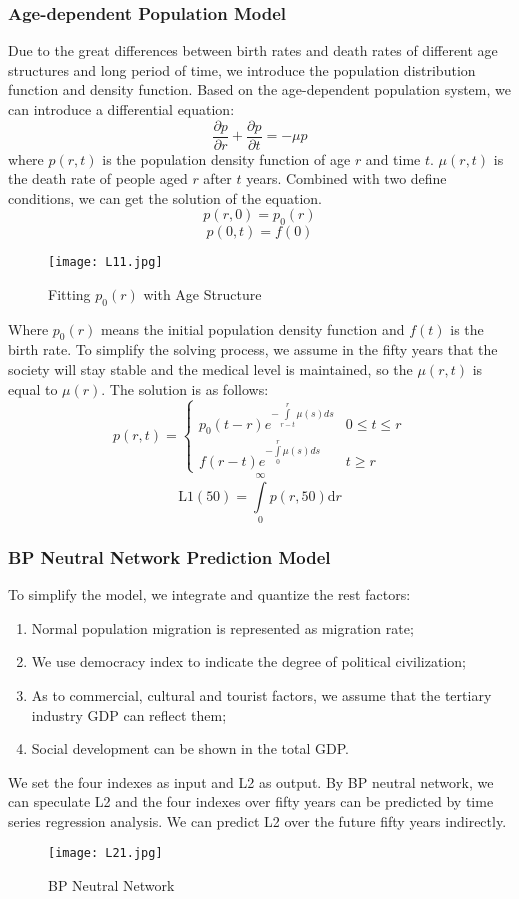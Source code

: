 \documentclass{mcmthesis}
\begin{document}
\subsubsection{Age-dependent Population Model}
Due to the great differences between birth rates and death rates of different age structures and long period of time, we introduce the population distribution function and density function. Based on the age-dependent population system, we can introduce a differential equation: 
  \[\frac{\partial p}{\partial r}+\frac{\partial p}{\partial t}=-\mu p\]
where \(p(r, t)\) is the population density function of age \(r\) and time \(t\). \(\mu(r, t)\) is the death rate of people aged \(r\) after \(t\) years. Combined with two define conditions, we can get the solution of the equation. 
\[p(r, 0)=p_0(r)\]
\[p(0, t)=f(0)\]
\begin{figure}[htbp]
\small
\centering
\texttt{[image: L11.jpg]}
\caption{Fitting \(p_0(r)\) with Age Structure}
\end{figure}
Where \(p_0(r)\) means the initial population density function and \(f(t)\) is the birth rate. 
To simplify the solving process, we assume in the fifty years that the society will stay stable and the medical level is maintained, so the \(\mu(r, t)\) is equal to \(\mu(r)\). The solution is as follows: 
\[p(r, t)=\left\{
\begin{array}{lc}
p_0(t-r)e^{-\int\limits_{r-t}^{r}\mu(s)ds}&0\leqslant t\leqslant r\\
f(r-t)e^{-\int\limits_{0}^{r}\mu(s)ds}&t\geqslant r
\end{array}\right. \]
\[\textrm{L1}(50)=\int\limits_0^{\infty}p(r, 50)\textrm{d}r\]

\subsubsection{BP Neutral Network Prediction Model}
To simplify the model, we integrate and quantize the rest factors: 
\begin{enumerate}[1]
\item Normal population migration is represented as migration rate;
\item We use democracy index to indicate the degree of political civilization; 
\item As to commercial, cultural and tourist factors, we assume that the tertiary industry GDP can reflect them;
\item Social development can be shown in the total GDP. 
\end{enumerate}
We set the four indexes as input and L2 as output. By BP neutral network, we can speculate L2 and the four indexes over fifty years can be predicted by time series regression analysis. We can predict L2 over the future fifty years indirectly. 
\begin{figure}[htbp]
\small
\centering
\texttt{[image: L21.jpg]}
\caption{BP Neutral Network} \label{BP Neutral Network}
\end{figure}
\end{document}
